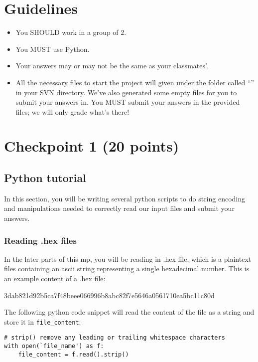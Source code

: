 \documentclass[letterpaper,12pt]{report}
\begin{document}
\section*{Guidelines}
\begin{itemize}
\item You SHOULD work in a group of 2.
\item You MUST use Python.
\item Your answers may or may not be the same as your classmates'.
\item All the necessary files to start the project will given under the folder called ``\mpnumber'' in your SVN directory.
We've also generated some empty files for you to submit your answers in.  You MUST submit your answers in the provided files; we will only grade what's there!
\end{itemize}

\pagebreak

\setcounter{chapter}{3}
\section{Checkpoint 1 (20 points)}
\subsection{Python tutorial}
\label{sec:python_tutorial}
In this section, you will be writing several python scripts to do string encoding and manipulations needed to correctly read our input files and submit your answers.

\subsubsection{Reading .hex files}
In the later parts of this mp, you will be reading in {.hex} file, which is a plaintext files containing an ascii string representing a single hexadecimal number.  This is an example content of a .hex file:
\begin{mdframed}
3dab821d92b5ca7f48beee066996b8abc82f7e5646a0561710ea5bc11c80d
\end{mdframed}

The following python code snippet will read the content of the file as a string and store it in \texttt{file\_content}:

\begin{mdframed}
\begin{verbatim}
# strip() remove any leading or trailing whitespace characters
with open(`file_name') as f: 
    file_content = f.read().strip()
\end{verbatim}
\end{mdframed}
\end{document}
